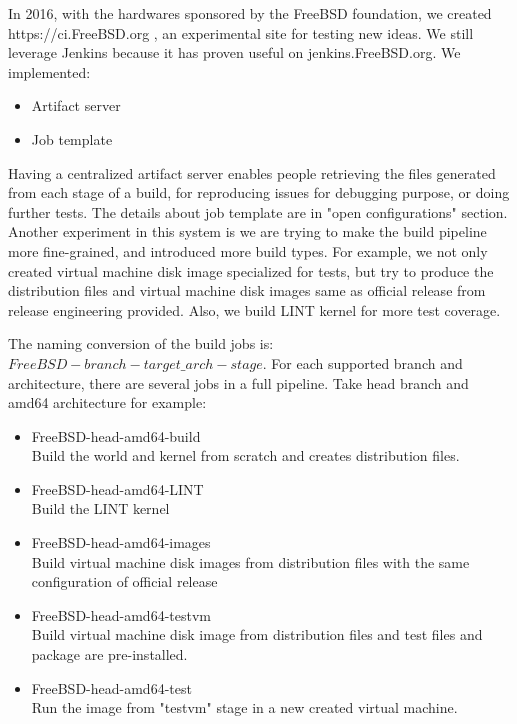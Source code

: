 \documentclass[a4paper,twocolumn,10pt]{article}
\begin{document}
In 2016, with the hardwares sponsored by the FreeBSD foundation, we created
https://ci.FreeBSD.org , an experimental site for testing new ideas. We still
leverage Jenkins because it has proven useful on jenkins.FreeBSD.org. We
implemented:

\begin{itemize}
\item Artifact server
\item Job template
\end{itemize}

Having a centralized artifact server enables people retrieving the files
generated from each stage of a build, for reproducing issues for debugging
purpose, or doing further tests. The details about job template are in "open
configurations" section. Another experiment in this system is we are trying to
make the build pipeline more fine-grained, and introduced more build types. For
example, we not only created virtual machine disk image specialized for tests,
but try to produce the distribution files and virtual machine disk images same
as official release from release engineering provided. Also, we build LINT
kernel for more test coverage.

The naming conversion of the build jobs is:
$FreeBSD-{branch}-{target\_arch}-{stage}$. For each supported branch and
architecture, there are several jobs in a full pipeline.  Take head branch and
amd64 architecture for example:

\begin{itemize}
\item FreeBSD-head-amd64-build\\
  Build the world and kernel from scratch and creates distribution files.
\item FreeBSD-head-amd64-LINT\\
  Build the LINT kernel
\item FreeBSD-head-amd64-images\\
  Build virtual machine disk images from distribution files with the same configuration of official release
\item FreeBSD-head-amd64-testvm\\
  Build virtual machine disk image from distribution files and test files and package are pre-installed.
\item FreeBSD-head-amd64-test\\
  Run the image from "testvm" stage in a new created virtual machine.
\end{itemize}
\end{document}
